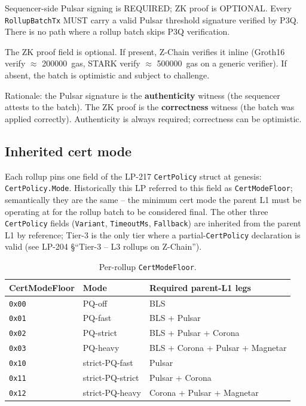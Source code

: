 Sequencer-side Pulsar signing is REQUIRED; ZK proof is OPTIONAL.
Every \texttt{RollupBatchTx} MUST carry a valid Pulsar threshold
signature verified by P3Q. There is no path where a rollup batch
skips P3Q verification.

The ZK proof field is optional. If present, Z-Chain verifies it
inline (Groth16 verify $\approx$ \SI{200000}{gas}, STARK verify
$\approx$ \SI{500000}{gas} on a generic verifier). If absent, the
batch is optimistic and subject to challenge.

Rationale: the Pulsar signature is the \textbf{authenticity}
witness (the sequencer attests to the batch). The ZK proof is the
\textbf{correctness} witness (the batch was applied correctly).
Authenticity is always required; correctness can be optimistic.

\subsection{Inherited cert mode}

Each rollup pins one field of the LP-217 \texttt{CertPolicy} struct
at genesis: \texttt{CertPolicy.Mode}. Historically this LP referred
to this field as \texttt{CertModeFloor}; semantically they are the
same -- the minimum cert mode the parent L1 must be operating at
for the rollup batch to be considered final. The other three
\texttt{CertPolicy} fields (\texttt{Variant}, \texttt{TimeoutMs},
\texttt{Fallback}) are inherited from the parent L1 by reference;
Tier-3 is the only tier where a partial-\texttt{CertPolicy}
declaration is valid (see LP-204 \S``Tier-3 -- L3 rollups on
Z-Chain'').

\begin{table}[h]
\centering
\small
\begin{tabular}{@{}llp{6cm}@{}}
\toprule
\textbf{CertModeFloor} & \textbf{Mode} & \textbf{Required parent-L1 legs} \\
\midrule
\texttt{0x00} & PQ-off & BLS \\
\texttt{0x01} & PQ-fast & BLS + Pulsar \\
\texttt{0x02} & PQ-strict & BLS + Pulsar + Corona \\
\texttt{0x03} & PQ-heavy & BLS + Corona + Pulsar + Magnetar \\
\texttt{0x10} & strict-PQ-fast & Pulsar \\
\texttt{0x11} & strict-PQ-strict & Pulsar + Corona \\
\texttt{0x12} & strict-PQ-heavy & Corona + Pulsar + Magnetar \\
\bottomrule
\end{tabular}
\caption{Per-rollup \texttt{CertModeFloor}.}
\label{tab:cert-mode-floor}
\end{table}

